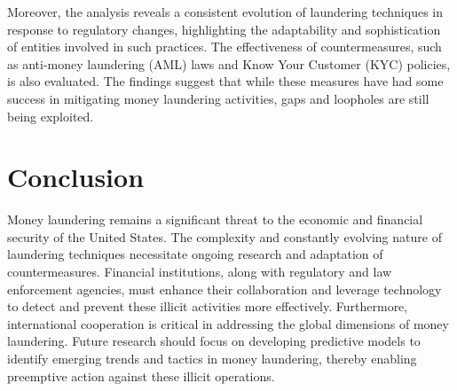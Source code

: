 \documentclass{article}
\begin{document}
Moreover, the analysis reveals a consistent evolution of laundering techniques in response to regulatory changes, highlighting the adaptability and sophistication of entities involved in such practices. The effectiveness of countermeasures, such as anti-money laundering (AML) laws and Know Your Customer (KYC) policies, is also evaluated. The findings suggest that while these measures have had some success in mitigating money laundering activities, gaps and loopholes are still being exploited.

\section{Conclusion}
Money laundering remains a significant threat to the economic and financial security of the United States. The complexity and constantly evolving nature of laundering techniques necessitate ongoing research and adaptation of countermeasures. Financial institutions, along with regulatory and law enforcement agencies, must enhance their collaboration and leverage technology to detect and prevent these illicit activities more effectively. Furthermore, international cooperation is critical in addressing the global dimensions of money laundering. Future research should focus on developing predictive models to identify emerging trends and tactics in money laundering, thereby enabling preemptive action against these illicit operations.
\end{document}

